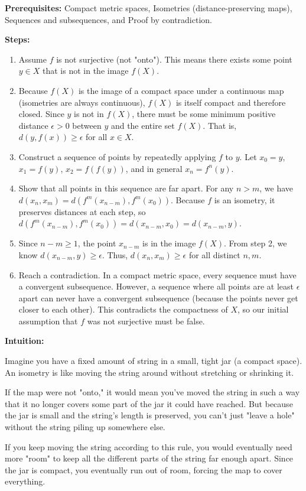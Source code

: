 \begin{solution}
\textbf{Prerequisites:} Compact metric spaces, Isometries (distance-preserving maps), Sequences and subsequences, and Proof by contradiction.

\textbf{Steps:}
\begin{enumerate}
    \item Assume $f$ is not surjective (not "onto"). This means there exists some point $y \in X$ that is not in the image $f(X)$.

    \item Because $f(X)$ is the image of a compact space under a continuous map (isometries are always continuous), $f(X)$ is itself compact and therefore closed. Since $y$ is not in $f(X)$, there must be some minimum positive distance $\epsilon > 0$ between $y$ and the entire set $f(X)$. That is, $d(y, f(x)) \geq \epsilon$ for all $x \in X$.

    \item Construct a sequence of points by repeatedly applying $f$ to $y$. Let $x_0 = y$, $x_1 = f(y)$, $x_2 = f(f(y))$, and in general $x_n = f^n(y)$.

    \item Show that all points in this sequence are far apart. For any $n > m$, we have $d(x_n, x_m) = d(f^m(x_{n-m}), f^m(x_0))$. Because $f$ is an isometry, it preserves distances at each step, so $d(f^m(x_{n-m}), f^m(x_0)) = d(x_{n-m}, x_0) = d(x_{n-m}, y)$.

    \item Since $n-m \geq 1$, the point $x_{n-m}$ is in the image $f(X)$. From step 2, we know $d(x_{n-m}, y) \geq \epsilon$. Thus, $d(x_n, x_m) \geq \epsilon$ for all distinct $n, m$.

    \item Reach a contradiction. In a compact metric space, every sequence must have a convergent subsequence. However, a sequence where all points are at least $\epsilon$ apart can never have a convergent subsequence (because the points never get closer to each other). This contradicts the compactness of $X$, so our initial assumption that $f$ was not surjective must be false.
\end{enumerate}

\textbf{Intuition:}

Imagine you have a fixed amount of string in a small, tight jar (a compact space). An isometry is like moving the string around without stretching or shrinking it. 

If the map were not "onto," it would mean you've moved the string in such a way that it no longer covers some part of the jar it could have reached. But because the jar is small and the string's length is preserved, you can't just "leave a hole" without the string piling up somewhere else. 

If you keep moving the string according to this rule, you would eventually need more "room" to keep all the different parts of the string far enough apart. Since the jar is compact, you eventually run out of room, forcing the map to cover everything.
\end{solution}

